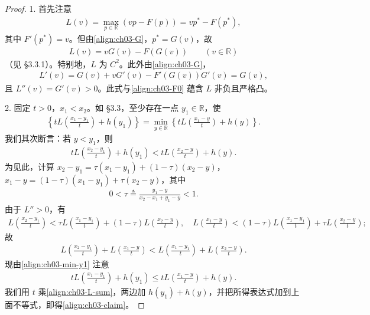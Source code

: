 \documentclass[../../main.tex]{subfiles}
\begin{document}
\begin{proof}
1. 首先注意
\begin{align*}
L(v)=\max_{p\in\mathbb{R}}(vp-F(p))=vp^*-F(p^*),
\end{align*}
其中 $F'(p^*)=v$。但由\eqref{align:ch03-G}，$p^*=G(v)$，故
\begin{align*}
L(v)=vG(v)-F(G(v)) \qquad(v\in\mathbb{R})
\end{align*}
（见 \S3.3.1）。特别地，$L$ 为 $C^2$。此外由\eqref{align:ch03-G}，
\begin{align}\label{align:ch03-Lprime}
L'(v)=G(v)+vG'(v)-F'(G(v))G'(v)=G(v),
\end{align}
且 $L''(v)=G'(v)>0$。此式与\eqref{align:ch03-F0} 蕴含 $L$ 非负且严格凸。

2. 固定 $t>0$，$x_1<x_2$。如 \S3.3，至少存在一点 $y_1\in\mathbb{R}$，使
\begin{align}\label{align:ch03-min-y1}
\left\{tL\!\left(\frac{x_1-y_1}{t}\right)+h(y_1)\right\}=\min_{y\in\mathbb{R}}\left\{tL\!\left(\frac{x_1-y}{t}\right)+h(y)\right\}.
\end{align}
我们其次断言：若 $y<y_1$，则
\begin{align}\label{align:ch03-claim}
tL\!\left(\frac{x_2-y_1}{t}\right)+h(y_1)<tL\!\left(\frac{x_2-y}{t}\right)+h(y).
\end{align}
为见此，计算 $x_2-y_1=\tau(x_1-y_1)+(1-\tau)(x_2-y)$，$x_1-y=(1-\tau)(x_1-y_1)+\tau(x_2-y)$，其中
\begin{align*}
0<\tau\triangleq\frac{y_1-y}{x_2-x_1+y_1-y}<1.
\end{align*}
由于 $L''>0$，有
\begin{align*}
L\!\left(\frac{x_2-y_1}{t}\right)<\tau L\!\left(\frac{x_1-y_1}{t}\right)+(1-\tau)L\!\left(\frac{x_2-y}{t}\right),\quad
L\!\left(\frac{x_1-y}{t}\right)<(1-\tau)L\!\left(\frac{x_1-y_1}{t}\right)+\tau L\!\left(\frac{x_2-y}{t}\right);
\end{align*}
故
\begin{align}\label{align:ch03-L-sum}
L\!\left(\frac{x_2-y_1}{t}\right)+L\!\left(\frac{x_1-y}{t}\right)<L\!\left(\frac{x_1-y_1}{t}\right)+L\!\left(\frac{x_2-y}{t}\right).
\end{align}
现由\eqref{align:ch03-min-y1} 注意
\begin{align*}
tL\!\left(\frac{x_1-y_1}{t}\right)+h(y_1)\leqslant tL\!\left(\frac{x_1-y}{t}\right)+h(y).
\end{align*}
我们用 $t$ 乘\eqref{align:ch03-L-sum}，两边加 $h(y_1)+h(y)$，并把所得表达式加到上面不等式，即得\eqref{align:ch03-claim}。


\end{proof}
\end{document}
